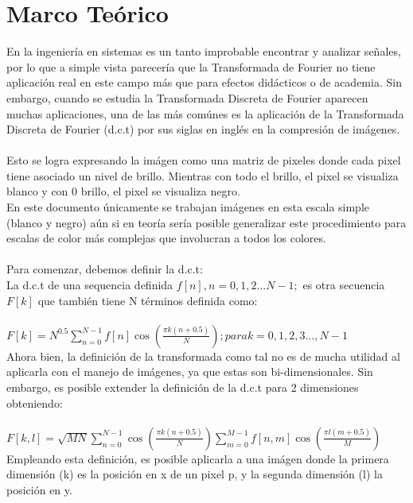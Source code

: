 \documentclass{article}
\begin{document}
	
\section{Marco Teórico}
	En la ingeniería en sistemas es un tanto improbable encontrar
	y analizar señales, por lo que a simple vista parecería que 
	la Transformada de Fourier no tiene aplicación real en este
	campo más que para efectos didácticos o de academia. Sin 
	embargo, cuando se estudia la Transformada Discreta de Fourier
	aparecen muchas aplicaciones, una de las más comúnes 
	es la aplicación de la Transformada Discreta de Fourier (d.c.t)
	por sus siglas en inglés en la compresión de imágenes.\\\\
	Esto se logra expresando la imágen como una matriz de 
	pixeles donde cada pixel tiene asociado un nivel de brillo.
	Mientras con todo el brillo, el pixel se visualiza blanco y 
	con 0 brillo, el pixel se visualiza negro.\\
	En este documento únicamente se trabajan imágenes en esta
	escala simple (blanco y negro) aún si en teoría sería posible
	generalizar este procedimiento para escalas de color 
	más complejas que involucran a todos los colores. \\\\
	
	Para comenzar, debemos definir la d.c.t: \\
	La d.c.t de una sequencia definida $ f[n], n = 0,1,2...N-1;$
	es otra secuencia  $F[k]$ que también tiene N términos 
	definida como: \\\\
	$ F[k] = N^{0.5} \sum_{n=0}^{N - 1} f[n] \cos{\left(\frac{\pi k \left(n + 0.5\right)}{N} \right)}; para k = 0,1,2,3..., N-1 $\\
	Ahora bien, la definición de la transformada como tal no es
	de mucha utilidad al aplicarla con el manejo de imágenes, ya 
	que estas son bi-dimensionales. Sin embargo, es 
	posible extender la definición de la d.c.t para 2 dimensiones
	obteniendo:\\\\
	$F[k,l] = 
\sqrt{M N} \sum_{n=0}^{N - 1} \cos{\left(\frac{\pi k \left(n + 0.5\right)}{N} \right)} \sum_{m=0}^{M - 1} f[n,m] \cos{\left(\frac{\pi l \left(m + 0.5\right)}{M} \right)}	
	$\\

	Empleando esta definición, es posible aplicarla a una 
	imágen donde la primera dimensión (k)
	es la posición en x de un pixel p,
	y la segunda dimensión (l) la posición en y.
\end{document}
